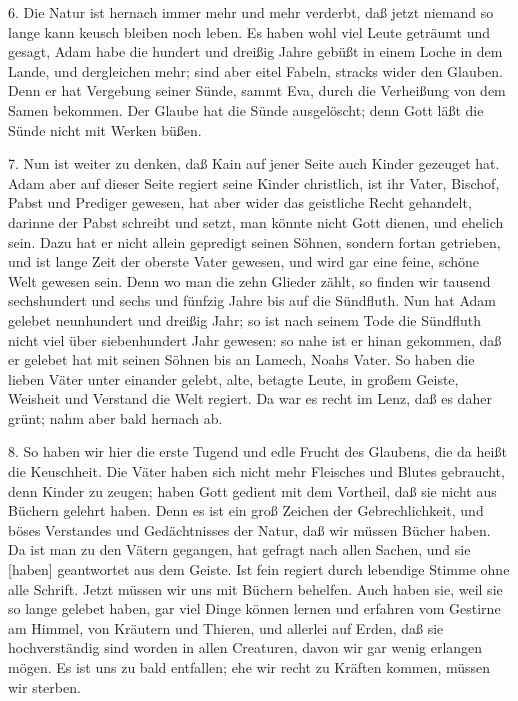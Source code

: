 6. Die Natur ist hernach immer mehr und mehr verderbt, daß jetzt niemand so lange kann keusch bleiben noch leben. Es haben wohl viel Leute geträumt und gesagt, Adam habe die hundert und dreißig Jahre gebüßt in einem Loche in dem Lande, und dergleichen mehr; sind aber eitel Fabeln, stracks wider den Glauben. Denn er hat Vergebung seiner Sünde, sammt Eva, durch die Verheißung von dem Samen bekommen. Der Glaube hat die Sünde ausgelöscht; denn Gott läßt die Sünde nicht mit Werken büßen.

7. Nun ist weiter zu denken, daß Kain auf jener Seite auch Kinder gezeuget hat. Adam aber auf dieser Seite regiert seine Kinder christlich, ist ihr Vater, Bischof, Pabst und Prediger gewesen, hat aber wider das geistliche Recht gehandelt, darinne der Pabst schreibt und setzt, man könnte nicht Gott dienen, und ehelich sein. Dazu hat er nicht allein gepredigt seinen Söhnen, sondern fortan getrieben, und ist lange Zeit der oberste Vater gewesen, und wird gar eine feine, schöne Welt gewesen sein. Denn wo man die zehn Glieder zählt, so finden wir tausend sechshundert und sechs und fünfzig Jahre bis auf die Sündfluth. Nun hat Adam gelebet neunhundert und dreißig Jahr; so ist nach seinem Tode die Sündfluth nicht viel über siebenhundert Jahr gewesen: so nahe ist er hinan gekommen, daß er gelebet hat mit seinen Söhnen bis an Lamech, Noahs Vater. So haben die lieben Väter unter einander gelebt, alte, betagte Leute, in großem Geiste, Weisheit und Verstand die Welt regiert. Da war es recht im Lenz, daß es daher grünt; nahm aber bald hernach ab.

8. So haben wir hier die erste Tugend und edle Frucht des Glaubens, die da heißt die Keuschheit. Die Väter haben sich nicht mehr Fleisches und Blutes gebraucht, denn Kinder zu zeugen; haben Gott gedient mit dem Vortheil, daß sie nicht aus Büchern gelehrt haben. Denn es ist ein groß Zeichen der Gebrechlichkeit, und böses Verstandes und Gedächtnisses der Natur, daß wir müssen Bücher haben. Da ist man zu den Vätern gegangen, hat gefragt nach allen Sachen, und sie [haben] geantwortet aus dem Geiste. Ist fein regiert durch lebendige Stimme
ohne alle Schrift. Jetzt müssen wir uns mit Büchern behelfen. Auch haben sie, weil sie so lange gelebet haben, gar viel Dinge können lernen und erfahren vom Gestirne am Himmel, von Kräutern und Thieren, und allerlei auf Erden, daß sie hochverständig sind worden in allen Creaturen, davon wir gar wenig erlangen mögen. Es ist uns zu bald entfallen; ehe wir recht zu Kräften kommen, müssen wir sterben.

